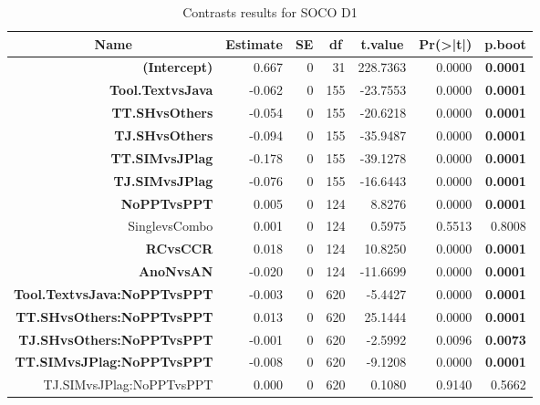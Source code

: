 \documentclass[a4paper, 12pt, oneside, openany, final, pdftex]{book}\usepackage[]{graphicx}\usepackage[]{color}
\begin{document}
\begin{table}
  \centering 
  \caption{Contrasts results for SOCO D1}\label{tbl:coefficientsSOCOD1} 

\begin{threeparttable}
\begin{tabular}{rrrrrrr}
\toprule
\multicolumn{1}{c}{\textbf{Name}} & \multicolumn{1}{c}{\textbf{Estimate}} & \multicolumn{1}{c}{\textbf{SE}} & \multicolumn{1}{c}{\textbf{df}} & \multicolumn{1}{c}{\textbf{t.value}} & \multicolumn{1}{c}{\textbf{Pr(>|t|)}} & \multicolumn{1}{c}{\textbf{p.boot}}\\
\midrule
\rowcolor{gray!6}  \textbf{(Intercept)} & 0.667 & 0 & 31 & 228.7363 & 0.0000 & \textbf{0.0001}\\
\textbf{Tool.TextvsJava} & -0.062 & 0 & 155 & -23.7553 & 0.0000 & \textbf{0.0001}\\
\rowcolor{gray!6}  \textbf{TT.SHvsOthers} & -0.054 & 0 & 155 & -20.6218 & 0.0000 & \textbf{0.0001}\\
\textbf{TJ.SHvsOthers} & -0.094 & 0 & 155 & -35.9487 & 0.0000 & \textbf{0.0001}\\
\rowcolor{gray!6}  \textbf{TT.SIMvsJPlag} & -0.178 & 0 & 155 & -39.1278 & 0.0000 & \textbf{0.0001}\\
\textbf{TJ.SIMvsJPlag} & -0.076 & 0 & 155 & -16.6443 & 0.0000 & \textbf{0.0001}\\
\rowcolor{gray!6}  \textbf{NoPPTvsPPT} & 0.005 & 0 & 124 & 8.8276 & 0.0000 & \textbf{0.0001}\\
SinglevsCombo & 0.001 & 0 & 124 & 0.5975 & 0.5513 & 0.8008\\
\rowcolor{gray!6}  \textbf{RCvsCCR} & 0.018 & 0 & 124 & 10.8250 & 0.0000 & \textbf{0.0001}\\
\textbf{AnoNvsAN} & -0.020 & 0 & 124 & -11.6699 & 0.0000 & \textbf{0.0001}\\
\hline
\rowcolor{gray!6}  \textbf{Tool.TextvsJava:NoPPTvsPPT} & -0.003 & 0 & 620 & -5.4427 & 0.0000 & \textbf{0.0001}\\
\textbf{TT.SHvsOthers:NoPPTvsPPT} & 0.013 & 0 & 620 & 25.1444 & 0.0000 & \textbf{0.0001}\\
\rowcolor{gray!6}  \textbf{TJ.SHvsOthers:NoPPTvsPPT} & -0.001 & 0 & 620 & -2.5992 & 0.0096 & \textbf{0.0073}\\
\textbf{TT.SIMvsJPlag:NoPPTvsPPT} & -0.008 & 0 & 620 & -9.1208 & 0.0000 & \textbf{0.0001}\\
\rowcolor{gray!6}  TJ.SIMvsJPlag:NoPPTvsPPT & 0.000 & 0 & 620 & 0.1080 & 0.9140 & 0.5662\\

\end{tabular}
\end{threeparttable}
\end{table}
\end{document}
